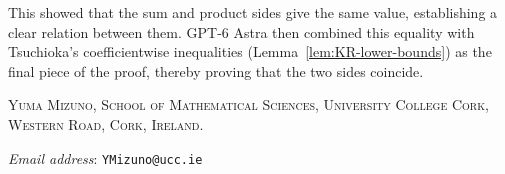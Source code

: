 \documentclass[11pt]{article}
\numberwithin{equation}{section}
\theoremstyle{remark}
\begin{document}
This showed that the sum and product sides give the same value, establishing a clear relation between them.
GPT-6 Astra then combined this equality with Tsuchioka's coefficientwise inequalities
(Lemma~\ref{lem:KR-lower-bounds}) as the final piece of the proof, thereby proving that the two sides coincide.

\printbibliography
\bigskip

\noindent
\textsc{Yuma Mizuno, School of Mathematical Sciences, University College Cork, Western Road,
Cork, Ireland.}\par
\noindent
\textit{Email address}: \texttt{YMizuno@ucc.ie}
\end{document}

